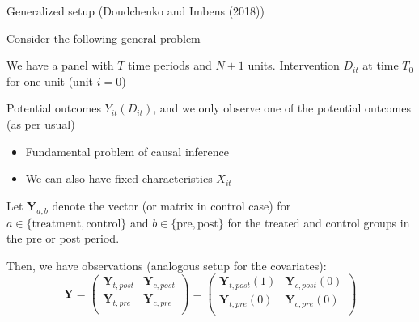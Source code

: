 \documentclass[notes,11pt, aspectratio=169]{beamer}
\newenvironment{wideitemize}{\itemize\addtolength{\itemsep}{10pt}}{\enditemize}
\begin{document}
\begin{frame}{Generalized setup (Doudchenko and Imbens (2018))}
  \begin{wideitemize}
  \item Consider the following general problem
    \item We have a panel with $T$ time periods and $N+1$
      units. Intervention $D_{it}$ at time $T_{0}$ for one unit (unit $i = 0$)
    \item Potential outcomes $Y_{it}(D_{it})$, and we only observe one
      of the potential outcomes (as per usual)
      \begin{itemize}
      \item Fundamental problem of causal inference
      \item We can also have fixed characteristics $X_{it}$
      \end{itemize}
    \item Let $\mathbf{Y}_{a,b}$ denote the vector (or matrix in
      control case) for $a \in \{\text{treatment}, \text{control}\}$ and
      $b \in \{\text{pre}, \text{post}\}$ for the treated and control
      groups in the pre or post period.
    \item Then, we have observations (analogous setup for the covariates):
      \begin{equation*}
        \mathbf{Y} = \left( \begin{array}{cc}
                              \mathbf{Y}_{t,post} & \mathbf{Y}_{c,post} \\
                              \mathbf{Y}_{t,pre} & \mathbf{Y}_{c,pre} \\
                            \end{array}
                            \right) =  \left( \begin{array}{cc}
                              \mathbf{Y}_{t,post}(1) & \mathbf{Y}_{c,post}(0) \\
                              \mathbf{Y}_{t,pre}(0) & \mathbf{Y}_{c,pre}(0) \\
                            \end{array}
                            \right)
      \end{equation*}
  \end{wideitemize}
\end{frame}
\end{document}
